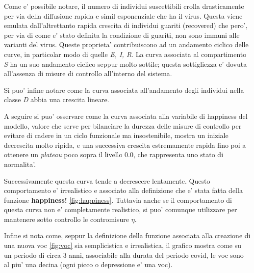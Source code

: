 Come e' possibile notare, il numero di individui suscettibili crolla drasticamente
per via della diffusione rapida e simil esponenziale che ha il virus. Questa viene emulata
dall'altrettanto rapida crescita di individui guariti (recovered) che pero', per via
di come e' stato definita la condizione di guariti, non sono immuni alle varianti del virus. 
Queste proprieta' contribuiscono ad un andamento ciclico delle curve, in particolar modo 
di quelle \emph{E, I, R}. La curva associata al compartimento \emph{S} ha un suo andamento
ciclico seppur molto sottile; questa sottigliezza e' dovuta all'assenza di misure di 
controllo all'interno del sistema.

Si puo' infine notare come la curva associata all'andamento degli individui
nella classe \emph{D} abbia una crescita lineare.

A seguire si puo' osservare come la curva associata alla variabile di happiness del modello,
valore che serve per bilanciare la durezza delle misure di controllo per evitare 
di cadere in un ciclo funzionale ma insostenibile, mostra un iniziale decrescita molto
ripida, e una successiva crescita estremamente rapida fino poi a ottenere un \emph{plateau}
poco sopra il livello 0.0, che rappresenta uno stato di normalita'. 

Successivamente questa curva tende a decrescere lentamente. Questo comportamento e' 
irrealistico e associato alla definizione che e' stata fatta della funzione \textbf{happiness!}
\ref{fig:happiness}. Tuttavia anche se il comportamento di questa curva non e' 
completamente realistico, si puo' comunque utilizzare per mantenere sotto controllo 
le contromisure $\eta$.

Infine si nota come, seppur la definizione della funzione associata alla creazione di una
nuova voc \ref{fig:voc} sia semplicistica e irrealistica, il grafico mostra come su un periodo 
di circa 3 anni, associabile alla durata del periodo covid, le voc sono al piu' 
una decina (ogni picco o depressione e' una voc). 

